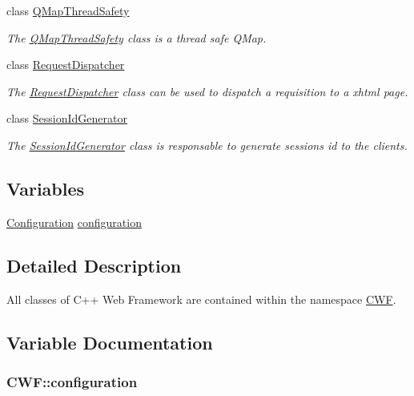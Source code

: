 \begin{DoxyCompactItemize}
class \hyperlink{class_c_w_f_1_1_q_map_thread_safety}{Q\+Map\+Thread\+Safety}
\begin{DoxyCompactList}\small\item\em The \hyperlink{class_c_w_f_1_1_q_map_thread_safety}{Q\+Map\+Thread\+Safety} class is a thread safe Q\+Map. \end{DoxyCompactList}\item 
class \hyperlink{class_c_w_f_1_1_request_dispatcher}{Request\+Dispatcher}
\begin{DoxyCompactList}\small\item\em The \hyperlink{class_c_w_f_1_1_request_dispatcher}{Request\+Dispatcher} class can be used to dispatch a requisition to a xhtml page. \end{DoxyCompactList}\item 
class \hyperlink{class_c_w_f_1_1_session_id_generator}{Session\+Id\+Generator}
\begin{DoxyCompactList}\small\item\em The \hyperlink{class_c_w_f_1_1_session_id_generator}{Session\+Id\+Generator} class is responsable to generate sessions id to the clients. \end{DoxyCompactList}\end{DoxyCompactItemize}
\subsection*{Variables}
\begin{DoxyCompactItemize}
\item 
\hyperlink{class_c_w_f_1_1_configuration}{Configuration} \hyperlink{namespace_c_w_f_a2f275195c5c69646f7df4e917febe552}{configuration}
\end{DoxyCompactItemize}


\subsection{Detailed Description}
All classes of C++ Web Framework are contained within the namespace \hyperlink{namespace_c_w_f}{C\+W\+F}. 

\subsection{Variable Documentation}
\hypertarget{namespace_c_w_f_a2f275195c5c69646f7df4e917febe552}{
\subsubsection[{configuration}]{ C\+W\+F\+::configuration}}\label{namespace_c_w_f_a2f275195c5c69646f7df4e917febe552}
